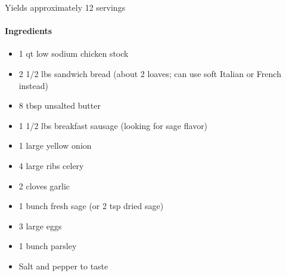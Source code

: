 \documentclass[12pt]{article}
\newenvironment*{ingredients}
	{
		\paragraph*{Ingredients}
		\begin{itemize}
	}
	{
		\end{itemize}
	}
\begin{document}
	Yields approximately 12 servings
	
	\begin{ingredients}
		\item 1 qt low sodium chicken stock
		\item 2 1/2 lbs sandwich bread (about 2 loaves; can use soft Italian or French instead)
		\item 8 tbsp unsalted butter
		\item 1 1/2 lbs breakfast sausage (looking for sage flavor)
		\item 1 large yellow onion
		\item 4 large ribs celery
		\item 2 cloves garlic
		\item 1 bunch fresh sage (or 2 tsp dried sage)
		\item 3 large eggs
		\item 1 bunch parsley
		\item Salt and pepper to taste
	\end{ingredients}
	
\end{document}
